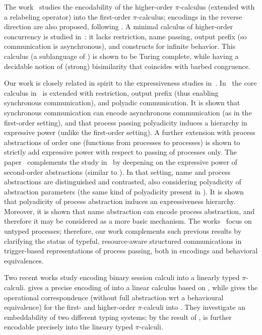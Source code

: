 The work~\cite{XuActa2012} studies the encodability of the higher-order $\pi$-calculus (extended with a relabeling operator) into the first-order $\pi$-calculus; encodings in the reverse direction are also proposed, following \cite{Tho90}.
A minimal calculus of higher-order concurrency is studied in~\cite{DBLP:journals/iandc/LanesePSS11}: it lacks restriction,  name passing, output prefix (so  communication is asynchronous), and constructs for infinite behavior. 
This calculus (a sublanguage of \HO) is shown to be Turing complete, while having a decidable notion of  
(strong) bisimilarity that coincides with barbed congruence. 

Our work is closely related in spirit to the expressiveness studies in~\cite{DBLP:conf/icalp/LanesePSS10,DBLP:conf/wsfm/XuYL13}.
In~\cite{DBLP:conf/icalp/LanesePSS10}
the core calculus in~\cite{DBLP:journals/iandc/LanesePSS11} is extended with restriction, output prefix (thus enabling synchronous communication), 
and polyadic communication. It is shown that 
synchronous communication can encode asynchronous communication (as in the first-order setting),
and that process passing polyadicity induces a hierarchy in expressive power (unlike the first-order setting).
A further extension with process abstractions of order one
(functions from processes to processes)
 is shown to strictly add expressive power with respect to passing of processes only.
The paper~\cite{DBLP:conf/wsfm/XuYL13} complements the study in~\cite{DBLP:conf/icalp/LanesePSS10} by deepening on the expressive power of second-order abstractions (similar to \HO). 
In that setting, name and process abstractions are distinguished and contrasted, also considering polyadicity of abstraction parameters (the same kind of polyadicity present in \pHOp). It is shown that polyadicity of process abstraction induces an expressiveness hierarchy. Moreover, it is shown that name abstraction can encode process abstraction, and therefore it may be considered as a more basic mechanism. 
The works~\cite{DBLP:conf/icalp/LanesePSS10,DBLP:conf/wsfm/XuYL13} focus on untyped processes;
therefore, our work complements such previous results by clarifying the status of typeful, resource-aware structured communications in
trigger-based representations of process passing, both in encodings and  behavioral equivalences.

Two recent works \cite{DemangeonH11,Dardha:2012:STR:2370776.2370794} 
study encoding binary session calculi into 
a linearly typed $\pi$-calculi. 
\cite{DemangeonH11}
gives a precise encoding of \sessp into a linear calculus 
based on \cite{BHY},  
while \cite{Dardha:2012:STR:2370776.2370794} 
gives the operational correspondence 
(without full abstraction wrt a behavioural equivalence)
for the first- and higher-order 
$\pi$-calculi \cite{tlca07} into \cite{LinearPi}. 
They investigate an embeddability of two different typing systems;
by the result of \cite{DemangeonH11}, \HOpp is further encodable precisely 
into the lineary typed $\pi$-calculi.     

